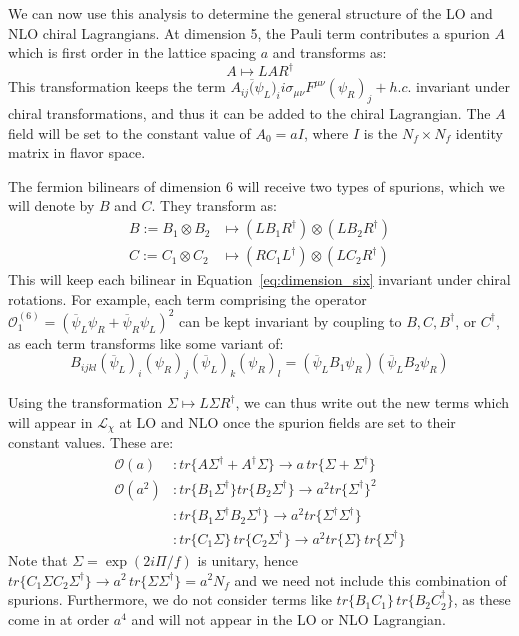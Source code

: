 \documentclass[11pt, oneside]{article}   	%
\theoremstyle{definition}
\begin{document}
We can now use this analysis to determine the general structure of the LO and NLO chiral Lagrangians. At dimension 
5, the Pauli term contributes a spurion $A$ which is first order in the lattice spacing $a$ and transforms as:
\begin{equation}
	A\mapsto L A R^\dagger
\end{equation}
This transformation keeps the term  $A_{ij}\overline(\psi_L)_i i\sigma_{\mu\nu} F^{\mu\nu}(\psi_R)_j + h.c.$ invariant under 
chiral transformations, and thus it can be added to the chiral Lagrangian. The $A$ field will be set to the constant value of 
$A_0 = a I$, where $I$ is the $N_f\times N_f$ identity matrix in flavor space. 

The fermion bilinears of dimension 6 will receive two types of spurions, which we will denote by $B$ and $C$. They 
transform as:
\begin{align}
    B := B_1\otimes B_2&\mapsto (L B_1 R^\dagger) \otimes (L B_2 R^\dagger) \nonumber \\
    C := C_1\otimes C_2 &\mapsto (R C_1 L^\dagger) \otimes (L C_2 R^\dagger) 
\end{align}
This will keep each bilinear in Equation~\ref{eq:dimension_six} invariant under chiral rotations. For example, each term 
comprising the operator $\mathcal O_1^{(6)} = (\overline\psi_L\psi_R + \overline\psi_R\psi_L)^2$ can be kept invariant 
by coupling to $B, C, B^\dagger$, or $C^\dagger$, as each term transforms like some variant of:
\begin{equation}
        B_{ijkl}(\overline\psi_L)_i(\psi_R)_j (\overline\psi_L)_k (\psi_R)_l = (\overline\psi_L B_1 \psi_R) (\overline\psi_L B_2 
        \psi_R)
\end{equation}

Using the transformation $\Sigma\mapsto L\Sigma R^\dagger$, we can thus write out the new terms which will appear in 
$\mathcal L_\chi$ at LO and NLO once the spurion fields are set to their constant values. These are:
\begin{align}
    \mathcal O(a) &:  tr\{A\Sigma^\dagger + A^\dagger\Sigma\}\rightarrow a\,tr\{\Sigma + \Sigma^\dagger\} \nonumber\\
    \mathcal O(a^2) &: tr\{B_1\Sigma^\dagger\}tr\{B_2\Sigma^\dagger\}\rightarrow a^2 tr\{\Sigma^\dagger\}^2 \nonumber\\
    &: tr\{B_1\Sigma^\dagger B_2 \Sigma^\dagger\}\rightarrow a^2 tr\{\Sigma^\dagger\Sigma^\dagger\} \nonumber\\
    &: tr\{C_1\Sigma\}\,tr\{C_2\Sigma^\dagger\}\rightarrow a^2 tr\{\Sigma\}\,tr\{\Sigma^\dagger\}
\end{align}
Note that $\Sigma = \exp(2i\Pi / f)$ is unitary, hence $tr\{C_1\Sigma C_2\Sigma^\dagger\}\rightarrow a^2\, 
tr\{\Sigma\Sigma^\dagger\} = a^2 N_f$ and we need not include this combination of spurions. Furthermore, we do not 
consider terms like $tr\{B_1 C_1\}\,tr\{B_2 C_2^\dagger\}$, as these come in at order $a^4$ and will not appear in the 
LO or NLO Lagrangian. 
\end{document}
